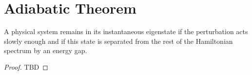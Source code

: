\section{Adiabatic Theorem}

\begin{theorem}
\label{addQAdiabatic}
A physical system remains in its instantaneous eigenstate
if the perturbation acts slowly enough and if this state
is separated from the rest of the Hamiltonian spectrum by an energy gap.
\end{theorem}

\begin{proof}
  TBD
\end{proof}